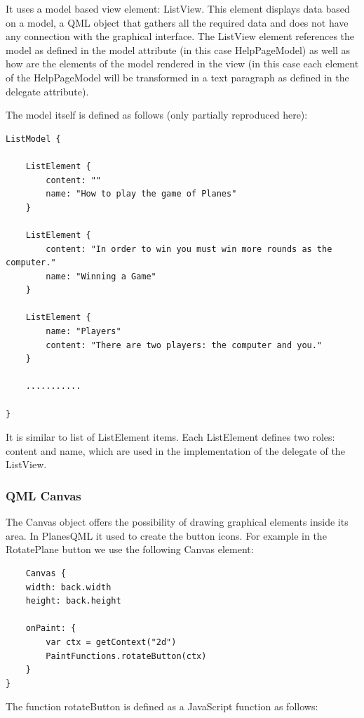 It uses a model based view element: ListView. This element displays data based on a model, a QML object that gathers all the required data and does not have any connection with the graphical interface. The ListView element references the model as defined in the model attribute (in this case HelpPageModel) as well as how are the elements of the model rendered in the view (in this case each element of the HelpPageModel will be transformed in a text paragraph as defined in the delegate attribute).

The model itself is defined as follows (only partially reproduced here):

\begin{lstlisting}
ListModel {

	ListElement {
		content: ""
		name: "How to play the game of Planes"
	}
	
	ListElement {
		content: "In order to win you must win more rounds as the computer."
		name: "Winning a Game"
	}
	
	ListElement {
		name: "Players"
		content: "There are two players: the computer and you."
	}
	
	...........
	
}
\end{lstlisting}

It is similar to list of ListElement items. Each ListElement defines two roles: content and name, which are used in the implementation of the delegate of the ListView.

\subsubsection {QML Canvas}

The Canvas object offers the possibility of drawing graphical elements inside its area. In PlanesQML it used to create the button icons. For example in the RotatePlane button we use the following Canvas element:

\begin{lstlisting}
    Canvas {
	width: back.width
	height: back.height
	
	onPaint: {
		var ctx = getContext("2d")
		PaintFunctions.rotateButton(ctx)
	}
}
\end{lstlisting}

The function rotateButton is defined as a JavaScript function as follows:

